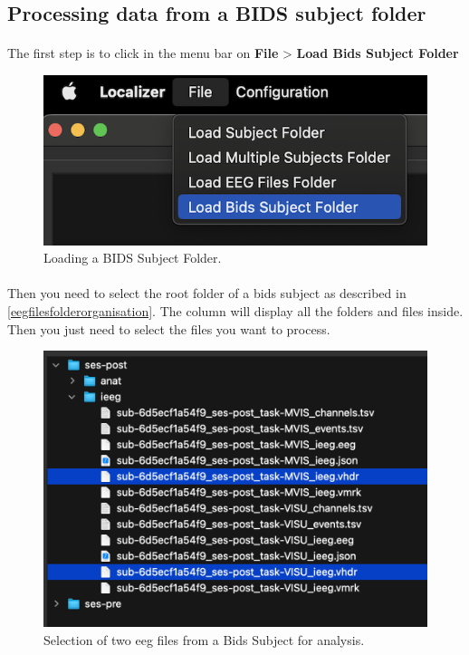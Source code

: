 \documentclass[a4paper]{article}
\begin{document}
\subsection{Processing data from a BIDS subject folder}
\paragraph{} The first step is to click in the menu bar on \textbf{File} > \textbf{Load Bids Subject Folder}
\begin{figure}[H]
\begin{center}
\includegraphics[scale=0.6]{SelectLoadBidsSubject.png}
\end{center}
\caption{\label{LoadBidsFolder}Loading a BIDS Subject Folder.}
\end{figure}

\paragraph{} Then you need to select the root folder of a bids subject as described in \ref{eegfilesfolderorganisation}. The column will display all the folders and files inside. Then you just need to select the files you want to process.

\begin{figure}[H]
\begin{center}
\includegraphics[scale=0.8]{BidsSubjectFolderSelect.png}
\end{center}
\caption{\label{BidsSubjectFolderSelectionUI}Selection of two eeg files from a Bids Subject for analysis.}
\end{figure}
\end{document}
